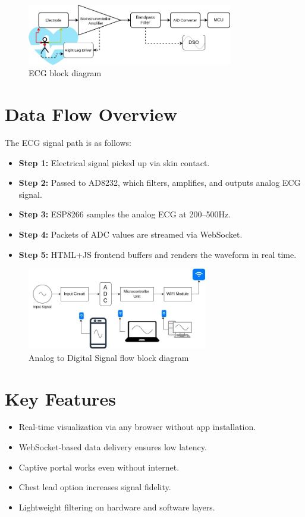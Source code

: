 \begin{figure}[H]
    \centering
    \includegraphics[width=0.8\textwidth]{images/ecg_block_diagram.jpg}
    \caption{ECG block diagram}
    \label{fig:ecg_block_diagram}
\end{figure}

\section{Data Flow Overview}
The ECG signal path is as follows:
\begin{itemize}
    \item \textbf{Step 1:} Electrical signal picked up via skin contact.
    \item \textbf{Step 2:} Passed to AD8232, which filters, amplifies, and outputs analog ECG signal.
    \item \textbf{Step 3:} ESP8266 samples the analog ECG at 200–500Hz.
    \item \textbf{Step 4:} Packets of ADC values are streamed via WebSocket.
    \item \textbf{Step 5:} HTML+JS frontend buffers and renders the waveform in real time.
\end{itemize}

\begin{figure}[H]
    \centering
    \includegraphics[width=0.7\textwidth]{images/dso_block_diagram.jpg}
    \caption{Analog to Digital Signal flow  block diagram}
    \label{fig:dso_block_diagram}
\end{figure}

\section{Key Features}
\begin{itemize}
    \item Real-time visualization via any browser without app installation.
    \item WebSocket-based data delivery ensures low latency.
    \item Captive portal works even without internet.
    \item Chest lead option increases signal fidelity.
    \item Lightweight filtering on hardware and software layers.
\end{itemize}






